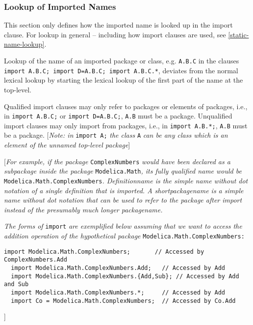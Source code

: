 \subsubsection{Lookup of Imported Names}

This section only defines how the imported name is looked up in the
import clause. For lookup in general -- including how import clauses are
used, see \autoref{static-name-lookup}.

Lookup of the name of an imported package or class, e.g. \lstinline[basicstyle=\ttfamily]!A.B.C! in the
clauses \lstinline[basicstyle=\ttfamily]!import A.B.C; import D=A.B.C; import A.B.C.*!, deviates from the
normal lexical lookup by starting the lexical lookup of the first part
of the name at the top-level.

Qualified import clauses may only refer to packages or elements of
packages, i.e., in \lstinline[basicstyle=\ttfamily]!import A.B.C;! or \lstinline[basicstyle=\ttfamily]!import D=A.B.C;!, 
\lstinline[basicstyle=\ttfamily]!A.B! must be a
package. Unqualified import clauses may only import from packages, i.e.,
in \lstinline[basicstyle=\ttfamily]!import A.B.*;!, \lstinline[basicstyle=\ttfamily]!A.B! must be a package. {[}\emph{Note: in} \lstinline[basicstyle=\ttfamily]!import A;!
\emph{the class} \lstinline[basicstyle=\ttfamily]!A! \emph{can be any class which is an element of the
unnamed top-level package}{]}

{[}\emph{For example, if the package} \lstinline[basicstyle=\ttfamily]!ComplexNumbers! \emph{would have
been declared as a subpackage inside the package} \lstinline[basicstyle=\ttfamily]!Modelica.Math!\emph{,
its fully qualified name would be} \lstinline[basicstyle=\ttfamily]!Modelica.Math.ComplexNumbers!\emph{.
Definitionname is the simple name without dot notation of a single
definition that is imported. A shortpackagename is a simple name without
dot notation that can be used to refer to the package after import
instead of the presumably much longer packagename.}


\emph{The forms of} \lstinline[basicstyle=\ttfamily]!import! \emph{are exemplified below assuming that we want to
access the addition operation of the hypothetical package}
\lstinline[basicstyle=\ttfamily]!Modelica.Math.ComplexNumbers:!

\begin{lstlisting}[language=modelica]
  import Modelica.Math.ComplexNumbers;       // Accessed by ComplexNumbers.Add
  import Modelica.Math.ComplexNumbers.Add;   // Accessed by Add
  import Modelica.Math.ComplexNumbers.{Add,Sub}; // Accessed by Add and Sub
  import Modelica.Math.ComplexNumbers.*;     // Accessed by Add
  import Co = Modelica.Math.ComplexNumbers;  // Accessed by Co.Add
\end{lstlisting}
{]}


